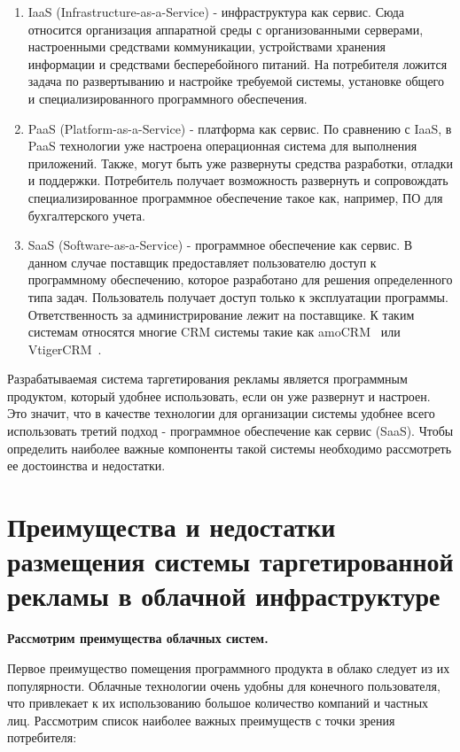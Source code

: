 \begin{enumerate}
	\item IaaS (Infrastructure-as-a-Service) - инфраструктура как сервис.
	Сюда относится организация аппаратной среды с организованными серверами, настроенными средствами коммуникации, устройствами хранения информации и средствами бесперебойного питаний. На потребителя ложится задача по развертыванию и настройке требуемой системы, установке общего и специализированного программного обеспечения.

	\item PaaS (Platform-as-a-Service) - платформа как сервис.
	По сравнению с IaaS, в PaaS технологии уже настроена операционная система для выполнения приложений. Также, могут быть уже развернуты средства разработки, отладки и поддержки. Потребитель получает возможность развернуть и сопровождать специализированное программное обеспечение такое как, например, ПО для бухгалтерского учета.

	\item SaaS (Software-as-a-Service) - программное обеспечение как сервис.
	В данном случае поставщик предоставляет пользователю доступ к программному обеспечению, которое разработано для решения определенного типа задач. Пользователь получает доступ только к эксплуатации программы. Ответственность за администрирование лежит на поставщике. К таким системам относятся многие CRM системы такие как amoCRM~\cite{amoCRMSite} или VtigerCRM~\cite{vtigerSite}.
\end{enumerate}

Разрабатываемая система таргетирования рекламы является программным продуктом, который удобнее использовать, если он уже развернут и настроен. Это значит, что в качестве технологии для организации системы удобнее всего использовать третий подход - программное обеспечение как сервис (SaaS). Чтобы определить наиболее важные компоненты такой системы необходимо рассмотреть ее достоинства и недостатки. 

\section{Преимущества и недостатки размещения системы таргетированной рекламы в облачной инфраструктуре}

\textbf{Рассмотрим преимущества облачных систем.}

Первое преимущество помещения программного продукта в облако следует из их популярности. Облачные технологии очень удобны для конечного пользователя, что привлекает к их использованию большое количество компаний и частных лиц. Рассмотрим список наиболее важных преимуществ с точки зрения потребителя:

